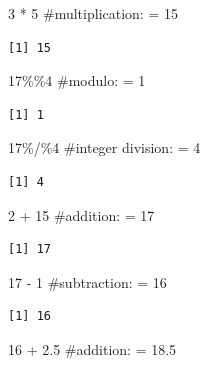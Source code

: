 \documentclass[
  letterpaper,
  DIV=11,
  numbers=noendperiod]{scrreprt}
\newenvironment{Shaded}{\begin{snugshade}}{\end{snugshade}}
\newcommand{\CommentTok}[1]{\textcolor[rgb]{0.37,0.37,0.37}{#1}}
\newcommand{\DecValTok}[1]{\textcolor[rgb]{0.68,0.00,0.00}{#1}}
\newcommand{\FloatTok}[1]{\textcolor[rgb]{0.68,0.00,0.00}{#1}}
\newcommand{\SpecialCharTok}[1]{\textcolor[rgb]{0.37,0.37,0.37}{#1}}
\begin{document}
\begin{Shaded}
\begin{Highlighting}[]
\DecValTok{3} \SpecialCharTok{*} \DecValTok{5}  \CommentTok{\#multiplication: = 15}
\end{Highlighting}
\end{Shaded}

\begin{verbatim}
[1] 15
\end{verbatim}

\begin{Shaded}
\begin{Highlighting}[]
\DecValTok{17}\SpecialCharTok{\%\%}\DecValTok{4}  \CommentTok{\#modulo: = 1}
\end{Highlighting}
\end{Shaded}

\begin{verbatim}
[1] 1
\end{verbatim}

\begin{Shaded}
\begin{Highlighting}[]
\DecValTok{17}\SpecialCharTok{\%/\%}\DecValTok{4}  \CommentTok{\#integer division: = 4}
\end{Highlighting}
\end{Shaded}

\begin{verbatim}
[1] 4
\end{verbatim}

\begin{Shaded}
\begin{Highlighting}[]
\DecValTok{2} \SpecialCharTok{+} \DecValTok{15}  \CommentTok{\#addition: = 17}
\end{Highlighting}
\end{Shaded}

\begin{verbatim}
[1] 17
\end{verbatim}

\begin{Shaded}
\begin{Highlighting}[]
\DecValTok{17} \SpecialCharTok{{-}} \DecValTok{1}  \CommentTok{\#subtraction: = 16}
\end{Highlighting}
\end{Shaded}

\begin{verbatim}
[1] 16
\end{verbatim}

\begin{Shaded}
\begin{Highlighting}[]
\DecValTok{16} \SpecialCharTok{+} \FloatTok{2.5}  \CommentTok{\#addition: = 18.5}
\end{Highlighting}
\end{Shaded}
\end{document}
